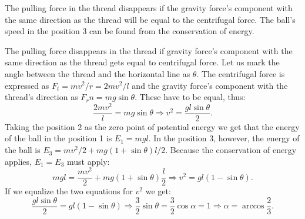 {\ifEngHint
The pulling force in the thread disappears if the gravity force’s component with the same direction as the thread will be equal to the centrifugal force. The ball’s speed in the position 3 can be found from the conservation of energy.
\fi


\ifEngSolution
The pulling force disappears in the thread if gravity force’s component with the same direction as the thread gets equal to centrifugal force. Let us mark the angle between the thread and the horizontal line as $\theta$. The centrifugal force is expressed as $F_t=mv^2/r=2mv^2/l$ and the gravity force’s component with the thread’s direction as $F_rn=mg\sin\theta$. These have to be equal, thus:
$$\frac{2mv^2}{l}=mg\sin\theta \Rightarrow v^2=\frac{gl\sin\theta}{2}.$$ 
Taking the position 2 as the zero point of potential energy we get that the energy of the ball in the position 1 is $E_1=mgl$. In the position 3, however, the energy of the ball is $E_3=mv^2/2+mg(1+\sin\theta)l/2$. Because the conservation of energy applies, $E_1=E_3$ must apply:
$$mgl=\frac{mv^2}{2}+mg(1+\sin\theta)\frac{l}{2} \Rightarrow v^2=gl(1-\sin\theta).$$ 
If we equalize the two equations for $v^2$ we get:
$$\frac{gl\sin\theta}{2}=gl(1-\sin\theta)\Rightarrow \frac{3}{2}\sin\theta=\frac{3}{2}\cos\alpha=1 \Rightarrow \alpha=\arccos\frac{2}{3}.$$
\fi
}